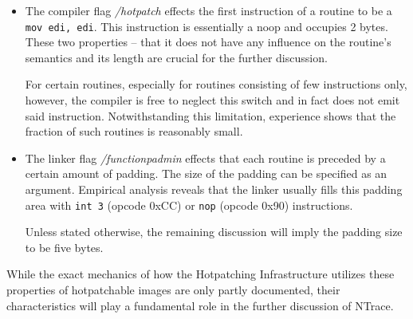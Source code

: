 \begin{itemize}
	\item The compiler flag \emph{/hotpatch} effects the first instruction of a 
		routine to be a \verb|mov edi, edi|. This instruction is essentially a noop
		and occupies 2 bytes. These two properties -- that it does not have any
		influence on the routine's semantics and its length are crucial for
		the further discussion.
		
		For certain routines, especially for routines consisting of few instructions
		only, however, the compiler is free to neglect this switch and in fact
		does not emit said instruction. Notwithstanding this limitation, experience 
		shows that the fraction of such routines is reasonably small.
		
	\item The linker flag \emph{/functionpadmin} effects that each routine is
		preceded by a certain amount of padding. The size of the padding can be
		specified as an argument. Empirical analysis reveals that the linker usually
		fills this padding area with \verb|int 3| (opcode 0xCC) or \verb|nop| 
		(opcode 0x90) instructions.
		
		Unless stated otherwise, the remaining discussion will imply the padding size 
		to be five bytes.
\end{itemize}

While the exact mechanics of how the Hotpatching Infrastructure utilizes these
properties of hotpatchable images are only partly documented, their characteristics
will play a fundamental role in the further discussion of NTrace.

%
%
%


